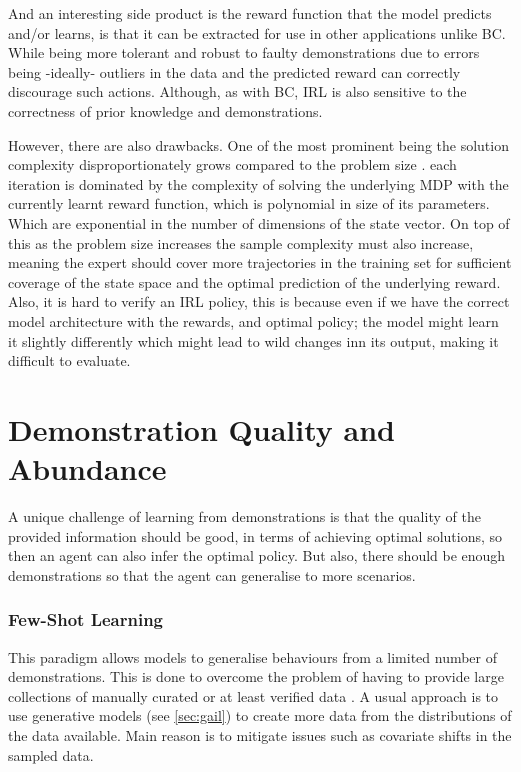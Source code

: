 And an interesting side product is the reward function that the model predicts and/or learns, is that it can be extracted for use in other applications unlike BC. While being more tolerant and robust to faulty demonstrations due to errors being -ideally- outliers in the data and the predicted reward can correctly discourage such actions. Although, as with BC, IRL is also sensitive to the correctness of prior knowledge and demonstrations.

However, there are also drawbacks. One of the most prominent being the solution complexity disproportionately grows compared to the problem size \cite{ARORA2021103500}. each iteration is dominated by the complexity of solving the underlying MDP with the currently learnt reward function, which is polynomial in size of its parameters. Which are exponential in the number of dimensions of the state vector. On top of this as the problem size increases the sample complexity must also increase, meaning the expert should cover more trajectories in the training set for sufficient coverage of the state space and the optimal prediction of the underlying reward. Also, it is hard to verify an IRL policy, this is because even if we have the correct model architecture with the rewards, and optimal policy; the model might learn it slightly differently which might lead to wild changes inn its output, making it difficult to evaluate.


\section{Demonstration Quality and Abundance}

A unique challenge of learning from demonstrations is that the quality of the provided information should be good, in terms of achieving optimal solutions, so then an agent can also infer the optimal policy. But also, there should be enough demonstrations so that the agent can generalise to more scenarios.

\subsubsection{Few-Shot Learning}\label{sec:few-shot}
This paradigm allows models to generalise behaviours from a limited number of demonstrations. This is done to overcome the problem of having to provide large collections of manually curated or at least verified data \cite{fewshotsurvey}. A usual approach is to use generative models (see \ref{sec:gail}) to create more data from the distributions of the data available. Main reason is to mitigate issues such as covariate shifts in the sampled data.


